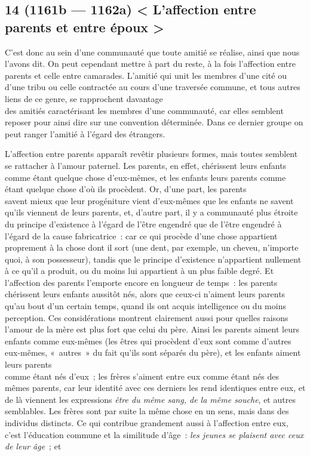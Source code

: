 \documentclass[french,twoside]{book} %
\begin{document}
\subsection[{14 (1161b — 1162a) < L’affection entre parents et entre époux >}]{14 (1161b — 1162a) < L’affection entre parents et entre époux >}
\noindent C’est donc au sein d’une communauté que toute amitié se réalise, ainsi que nous l’avons dit. On peut cependant mettre à part du reste, à la fois l’affection entre parents et celle entre camarades. L’amitié qui unit les membres d’une cité ou d’une tribu ou celle contractée au cours d’une traversée commune, et tous autres liens de ce genre, se rapprochent davantage \\
des amitiés caractérisant les membres d’une communauté, car elles semblent reposer pour ainsi dire sur une convention déterminée. Dans ce dernier groupe on peut ranger l’amitié à l’égard des étrangers.\par
L’affection entre parents apparaît revêtir plusieurs formes, mais toutes semblent se rattacher à l’amour paternel. Les parents, en effet, chérissent leurs enfants comme étant quelque chose d’eux-mêmes, et les enfants leurs parents comme étant quelque chose d’où ils procèdent. Or, d’une part, les parents \\
savent mieux que leur progéniture vient d’eux-mêmes que les enfants ne savent qu’ils viennent de leurs parents, et, d’autre part, il y a communauté plus étroite du principe d’existence à l’égard de l’être engendré que de l’être engendré à l’égard de la cause fabricatrice : car ce qui procède d’une chose appartient proprement à la chose dont il sort (une dent, par exemple, un cheveu, n’importe quoi, à son possesseur), tandis que le principe d’existence n’appartient nullement à ce qu’il a produit, ou du moins lui appartient à un plus faible degré. Et l’affection des parents l’emporte encore en longueur de temps : les parents \\
chérissent leurs enfants aussitôt nés, alors que ceux-ci n’aiment leurs parents qu’au bout d’un certain temps, quand ils ont acquis intelligence ou du moins perception. Ces considérations montrent clairement aussi pour quelles raisons l’amour de la mère est plus fort que celui du père. Ainsi les parents aiment leurs enfants comme eux-mêmes (les êtres qui procèdent d’eux sont comme d’autres eux-mêmes, « autres » du fait qu’ils sont séparés du père), et les enfants aiment leurs parents \\
comme étant nés d’eux ; les frères s’aiment entre eux comme étant nés des mêmes parents, car leur identité avec ces derniers les rend identiques entre eux, et de là viennent les expressions {\itshape être du même sang, de la même souche}, et autres semblables. Les frères sont par suite la même chose en un sens, mais dans des individus distincts. Ce qui contribue grandement aussi à l’affection entre eux, c’est l’éducation commune et la similitude d’âge : {\itshape les jeunes se plaisent avec ceux de leur âge} ; et \\
\end{document}
